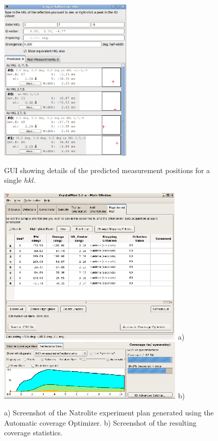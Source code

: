 \documentclass[final]{iucr}              %
\begin{document}
\begin{figure}
\caption{GUI showing details of the predicted measurement positions for a
single $hkl$.}
\includegraphics[width=2.5in]{single_reflection_2.eps}
\label{fig:single_reflection}
\end{figure}


\begin{figure}
\caption{a) Screenshot of the Natrolite experiment plan generated using the
Automatic coverage Optimizer. b) Screenshot of the resulting coverage
statistics.}
\includegraphics[width=3.5in]{Plan8List.eps}
a)
\includegraphics[width=3.5in]{NatCoverage.eps}
b)
\label{fig:natrolite_gui}
\end{figure}
\end{document}
